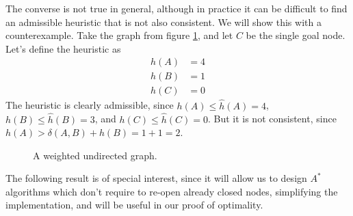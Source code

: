 \documentclass[12pt]{report}
\begin{document}
The converse is not true in general, although in practice it can be difficult to find an admissible heuristic that is not also consistent. We will show this with a counterexample. Take the graph from figure \ref{fig:heuristic}, and let $C$ be the single goal node. Let's define the heuristic as
\begin{align*}
h(A) &= 4\\
h(B) &= 1\\
h(C) &= 0
\end{align*}
The heuristic is clearly admissible, since $h(A) \leq \hat{h}(A) = 4$, $h(B) \leq \hat{h}(B) = 3$, and $h(C) \leq \hat{h}(C) = 0$. But it is not consistent, since $h(A) > \delta(A, B) + h(B) = 1 + 1 = 2$.

\begin{figure}
\centering
{}
\caption{A weighted undirected graph.}
\label{fig:heuristic}
\end{figure}

The following result is of special interest, since it will allow us to design $A^*$ algorithms which don't require to re-open already closed nodes, simplifying the implementation, and will be useful in our proof of optimality.
\end{document}
